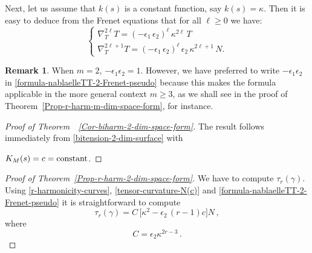 \documentclass[11pt]{amsart}
\theoremstyle{plain}
\theoremstyle{definition}
\newtheorem{remark}       [theorem]  {Remark}
\numberwithin{equation}{section}
\def \link {~}
\begin{document}
Next, let us assume that $k(s)$ is a constant function, say $k(s)=\kappa$. Then it is easy to deduce from the Frenet equations that for all $\ell \geq 0$ we have:
\begin{equation}\label{formula-nablaelleTT-2-Frenet-pseudo}
\begin{cases}
\nabla_T^{2\ell} T= (-\epsilon_1\, \epsilon_2)^{\ell}\,\kappa^{2\ell} \,T \\
\nabla_T^{2\ell+1} T= (-\epsilon_1\, \epsilon_2)^{\ell}\, \epsilon_2\, \kappa^{2\ell+1}\,N.
\end{cases} 
\end{equation}

\begin{remark} When $m=2$, $-\epsilon_1 \epsilon_2 =1$. However, we have preferred to write $-\epsilon_1 \epsilon_2$ in \eqref{formula-nablaelleTT-2-Frenet-pseudo} because this makes the formula applicable in the more general context $m \geq 3 $, as we shall see in the proof of Theorem~\ref{Prop-r-harm-m-dim-space-form}, for instance.
\end{remark}
\begin{proof}[Proof of Theorem~\link\ref{Cor-biharm-2-dim-space-form}]
The result follows immediately from \eqref{bitension-2-dim-surface} with 

\noindent $K_M(s)=c={\rm constant}$. 
\end{proof}

\begin{proof}[Proof of Theorem~\ref{Prop-r-harm-2-dim-space-form}] We have to compute $\tau_r(\gamma)$. Using \eqref{r-harmonicity-curves}, \eqref{tensor-curvature-N(c)} and \eqref{formula-nablaelleTT-2-Frenet-pseudo} it is straightforward to compute
\[
\tau_r(\gamma)= C\, \big [\kappa^2 -\epsilon_2\, (r-1)c \big ] N\,,
\]
where
\[
C=\epsilon_2 \kappa^{2r-3} \,.
\]
\end{proof}
\end{document}
